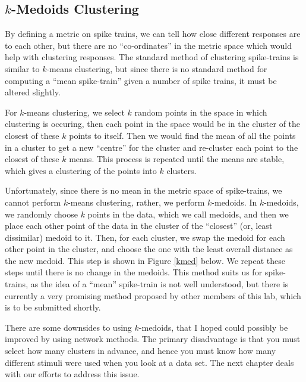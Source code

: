\subsection{$k$-Medoids Clustering}

By defining a metric on spike trains, we can tell how close different responses 
are to each other, but there are no ``co-ordinates'' in the metric space which 
would help with clustering responses.  The standard method of clustering 
spike-trains is similar to $k$-means clustering, but since there is no standard 
method for computing a ``mean spike-train'' given a number of spike trains, it 
must be altered slightly.

For $k$-means clustering, we select $k$ random points in the space in which 
clustering is occuring, then each point in the space would be in the cluster of 
the closest of these $k$ points to itself.  Then we would find the mean of all 
the points in a cluster to get a new ``centre'' for the cluster and re-cluster 
each point to the closest of these $k$ means.  This process is repeated until 
the means are stable, which gives a clustering of the points into $k$ clusters.

Unfortunately, since there is no mean in the metric space of spike-trains, we 
cannot perform $k$-means clustering, rather, we perform $k$-medoids.  In 
$k$-medoids, we randomly choose $k$ points in the data, which we call medoids, 
and then we place each other point of the data in the cluster of the 
``closest'' (or, least dissimilar) medoid to it.  Then, for each cluster, we 
swap the medoid for each other point in the cluster, and choose the one with 
the least overall distance as the new medoid. This step is shown in Figure 
\ref{kmed} below. We repeat these steps until there is no change in the 
medoids.  This method suits us for spike-trains, as the idea of a ``mean'' 
spike-train is not well understood, but there is currently a very promising 
method proposed by other members of this lab, which is to be submitted shortly.

There are some downsides to using $k$-medoids, that I hoped could possibly be 
improved by using network methods.  The primary disadvantage is that you must 
select how many clusters in advance, and hence you must know how many different 
stimuli were used when you look at a data set.  The next chapter deals with our 
efforts to address this issue.


